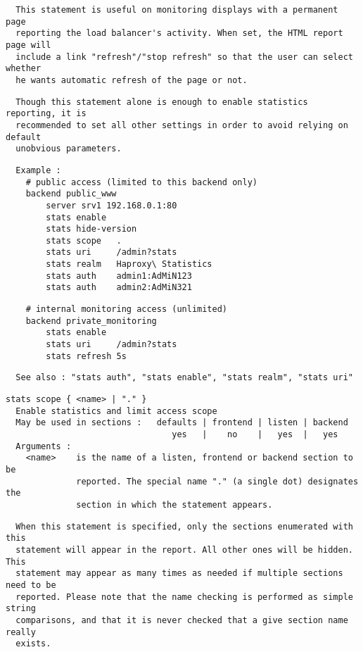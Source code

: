 \begin{verbatim}
  This statement is useful on monitoring displays with a permanent page
  reporting the load balancer's activity. When set, the HTML report page will
  include a link "refresh"/"stop refresh" so that the user can select whether
  he wants automatic refresh of the page or not.
\end{verbatim}

\begin{verbatim}
  Though this statement alone is enough to enable statistics reporting, it is
  recommended to set all other settings in order to avoid relying on default
  unobvious parameters.
\end{verbatim}

\begin{verbatim}
  Example :
    # public access (limited to this backend only)
    backend public_www
        server srv1 192.168.0.1:80
        stats enable
        stats hide-version
        stats scope   .
        stats uri     /admin?stats
        stats realm   Haproxy\ Statistics
        stats auth    admin1:AdMiN123
        stats auth    admin2:AdMiN321
\end{verbatim}

\begin{verbatim}
    # internal monitoring access (unlimited)
    backend private_monitoring
        stats enable
        stats uri     /admin?stats
        stats refresh 5s
\end{verbatim}

\begin{verbatim}
  See also : "stats auth", "stats enable", "stats realm", "stats uri"
\end{verbatim}

\begin{verbatim}
stats scope { <name> | "." }
  Enable statistics and limit access scope
  May be used in sections :   defaults | frontend | listen | backend
                                 yes   |    no    |   yes  |   yes
  Arguments :
    <name>    is the name of a listen, frontend or backend section to be
              reported. The special name "." (a single dot) designates the
              section in which the statement appears.
\end{verbatim}

\begin{verbatim}
  When this statement is specified, only the sections enumerated with this
  statement will appear in the report. All other ones will be hidden. This
  statement may appear as many times as needed if multiple sections need to be
  reported. Please note that the name checking is performed as simple string
  comparisons, and that it is never checked that a give section name really
  exists.
\end{verbatim}

